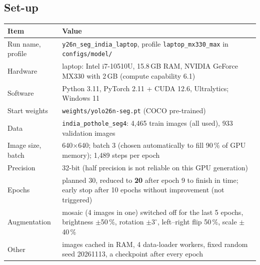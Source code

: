 \documentclass[11pt,a4paper]{article}
\newcommand{\code}[1]{\texttt{\small #1}}
\begin{document}
\subsection{Set-up}
\begin{center}
\small
\begin{tabularx}{\textwidth}{@{}>{\raggedright\arraybackslash}p{42mm} X@{}}
\toprule
\textbf{Item} & \textbf{Value}\\
\midrule
Run name, profile & \code{y26n\_seg\_india\_laptop}, profile \code{laptop\_mx330\_max} in \code{configs/model/}\\
Hardware & laptop: Intel i7-10510U, 15.8\,GB RAM, NVIDIA GeForce MX330 with 2\,GB (compute capability 6.1)\\
Software & Python 3.11, PyTorch 2.11 + CUDA 12.6, Ultralytics; Windows 11\\
Start weights & \code{weights/yolo26n-seg.pt} (COCO pre-trained)\\
Data & \code{india\_pothole\_seg4}: 4,465 train images (all used), 933 validation images\\
Image size, batch & 640$\times$640; batch 3 (chosen automatically to fill 90\,\% of GPU memory); 1,489 steps per epoch\\
Precision & 32-bit (half precision is not reliable on this GPU generation)\\
Epochs & planned 30, reduced to \textbf{20} after epoch 9 to finish in time; early stop after 10 epochs without improvement (not triggered)\\
Augmentation & mosaic (4 images in one) switched off for the last 5 epochs, brightness $\pm$50\,\%, rotation $\pm3^\circ$, left--right flip 50\,\%, scale $\pm$40\,\%\\
Other & images cached in RAM, 4 data-loader workers, fixed random seed 20261113, a checkpoint after every epoch\\
\bottomrule
\end{tabularx}
\end{center}
\end{document}
